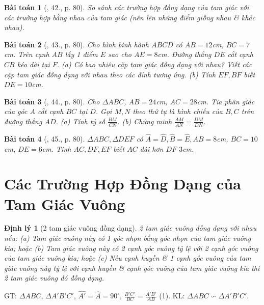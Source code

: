\documentclass{article}
\newtheorem{baitoan}{Bài toán}
\newtheorem{dinhly}{Định lý}
\begin{document}
\begin{baitoan}[\cite{SGK_Toan_8_tap_2}, 42., p. 80]
	So sánh các trường hợp đồng dạng của tam giác với các trường hợp bằng nhau của tam giác (nên lên những điểm giống nhau \& khác nhau).
\end{baitoan}

\begin{baitoan}[\cite{SGK_Toan_8_tap_2}, 43., p. 80]
	Cho hình bình hành $ABCD$ có $AB = 12$\emph{cm}, $BC = 7$\emph{cm}. Trên cạnh $AB$ lấy 1 điểm $E$ sao cho $AE = 8$\emph{cm}. Đường thẳng $DE$ cắt cạnh $CB$ kéo dài tại $F$. (a) Có bao nhiêu cặp tam giác đồng dạng với nhau? Viết các cặp tam giác đồng dạng với nhau theo các đỉnh tương ứng. (b) Tính $EF,BF$ biết $DE = 10$\emph{cm}.
\end{baitoan}

\begin{baitoan}[\cite{SGK_Toan_8_tap_2}, 44., p. 80]
	Cho $\Delta ABC$, $AB = 24$\emph{cm}, $AC = 28$\emph{cm}. Tia phân giác của góc $A$ cắt cạnh $BC$ tại $D$. Gọi $M,N$ theo thứ tự là hình chiếu của $B,C$ trên đường thẳng $AD$. (a) Tính tỷ số $\frac{BM}{CN}$. (b) Chứng minh $\frac{AM}{AN} = \frac{DM}{DN}$.
\end{baitoan}

\begin{baitoan}[\cite{SGK_Toan_8_tap_2}, 45., p. 80]
	$\Delta ABC,\Delta DEF$ có $\widehat{A} = \widehat{D}, \widehat{B} = \widehat{E}, AB = 8$\emph{cm}, $BC = 10$\emph{cm}, $DE = 6$\emph{cm}. Tính $AC,DF,EF$ biết $AC$ dài hơn $DF$ $3$\emph{cm}.	
\end{baitoan}


\section{Các Trường Hợp Đồng Dạng của Tam Giác Vuông}

\begin{dinhly}[2 tam giác vuông đồng dạng]
	2 tam giác vuông đồng dạng với nhau nếu: (a) Tam giác vuông này có 1 góc nhọn bằng góc nhọn của tam giác vuông kia; hoặc (b) Tam giác vuông này có 2 cạnh góc vuông tỷ lệ với 2 cạnh góc vuông của tam giác vuông kia; hoặc (c) Nếu cạnh huyền \& 1 cạnh góc vuông của tam giác vuông này tỷ lệ với cạnh huyền \& cạnh góc vuông của tam giác vuông kia thì 2 tam giác vuông đó đồng dạng.
\end{dinhly}
GT: $\Delta ABC$, $\Delta A'B'C'$, $\widehat{A'} = \widehat{A} = 90^\circ$, $\frac{B'C'}{BC} = \frac{A'B'}{AB}$ (1). KL: $\Delta ABC\backsim\Delta A'B'C'$.
\end{document}
